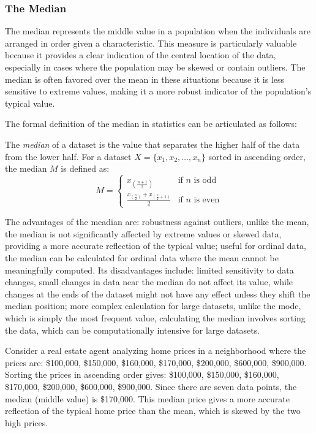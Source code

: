 
\subsubsection*{The Median}
\label{sec:median}

The median represents the middle value in a population when the individuals are arranged in order given a characteristic. This measure is particularly valuable because it provides a clear indication of the central location of the data, especially in cases where the population may be skewed or contain outliers. The median is often favored over the mean in these situations because it is less sensitive to extreme values, making it a more robust indicator of the population's typical value.

The formal definition of the median in statistics can be articulated as follows:

\begin{definition}
The \emph{median} of a dataset is the value that separates the higher half of the data from the lower half. For a dataset \( X = \{x_1, x_2, \dots, x_n\} \) sorted in ascending order, the median \( M \) is defined as:
\[
M = \begin{cases} 
x_{\left(\frac{n+1}{2}\right)} & \text{if } n \text{ is odd} \\
\frac{x_{\left(\frac{n}{2}\right)} + x_{\left(\frac{n}{2}+1\right)}}{2} & \text{if } n \text{ is even}
\end{cases}
\]
\end{definition}

The advantages of the meadian are: robustness against outliers, unlike the mean, the median is not significantly affected by extreme values or skewed data, providing a more accurate reflection of the typical value; useful for ordinal data, the median can be calculated for ordinal data where the mean cannot be meaningfully computed. Its disadvantages include: limited sensitivity to data changes, small changes in data near the median do not affect its value, while changes at the ends of the dataset might not have any effect unless they shift the median position; more complex calculation for large datasets, unlike the mode, which is simply the most frequent value, calculating the median involves sorting the data, which can be computationally intensive for large datasets.

\begin{example}
Consider a real estate agent analyzing home prices in a neighborhood where the prices are: \$100,000, \$150,000, \$160,000, \$170,000, \$200,000, \$600,000, \$900,000. Sorting the prices in ascending order gives: \$100,000, \$150,000, \$160,000, \$170,000, \$200,000, \$600,000, \$900,000. Since there are seven data points, the median (middle value) is \$170,000. This median price gives a more accurate reflection of the typical home price than the mean, which is skewed by the two high prices.
\end{example}

